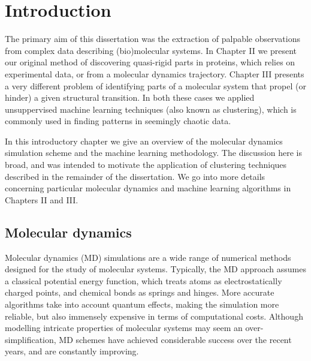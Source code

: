 

\chapter{Introduction}

The primary aim of this dissertation was the extraction of palpable observations from complex data describing (bio)molecular systems.
In Chapter II we present our original method of discovering quasi-rigid parts in proteins, which relies on experimental data, or from a molecular dynamics trajectory.
Chapter III presents a very different problem of identifying parts of a molecular system that propel (or hinder) a given structural transition.
In both these cases we applied unsuppervised machine learning techniques (also known as clustering), which is commonly used in finding patterns in seemingly chaotic data.

In this introductory chapter we give an overview of the molecular dynamics simulation scheme and the machine learning methodology.
The discussion here is broad, and was intended to motivate the application of clustering techniques described in the remainder of the dissertation. %
We go into more details concerning particular molecular dynamics and machine learning algorithms in Chapters II and III.


\section{Molecular dynamics}

Molecular dynamics (MD) simulations are a wide range of numerical methods designed for the study of molecular systems.
Typically, the MD approach assumes a classical potential energy function, which treats atoms as electrostatically charged points, and chemical bonds as springs and hinges.
More accurate algorithms take into account quantum effects, making the simulation more reliable, but also immensely expensive in terms of computational costs.
Although modelling intricate properties of molecular systems may seem an over-simplification, MD schemes have achieved considerable success over the recent years, and are constantly improving.

